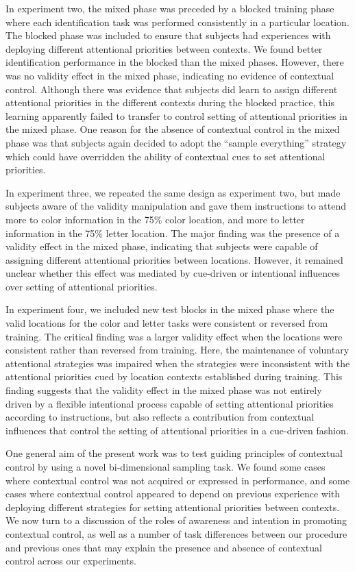 \documentclass[]{DissertateCUNY}
\begin{document}
In experiment two, the mixed phase was preceded by a blocked training
phase where each identification task was performed consistently in a
particular location. The blocked phase was included to ensure that
subjects had experiences with deploying different attentional priorities
between contexts. We found better identification performance in the
blocked than the mixed phases. However, there was no validity effect in
the mixed phase, indicating no evidence of contextual control. Although
there was evidence that subjects did learn to assign different
attentional priorities in the different contexts during the blocked
practice, this learning apparently failed to transfer to control setting
of attentional priorities in the mixed phase. One reason for the absence
of contextual control in the mixed phase was that subjects again decided
to adopt the ``sample everything'' strategy which could have overridden
the ability of contextual cues to set attentional priorities.

In experiment three, we repeated the same design as experiment two, but
made subjects aware of the validity manipulation and gave them
instructions to attend more to color information in the 75\% color
location, and more to letter information in the 75\% letter location.
The major finding was the presence of a validity effect in the mixed
phase, indicating that subjects were capable of assigning different
attentional priorities between locations. However, it remained unclear
whether this effect was mediated by cue-driven or intentional influences
over setting of attentional priorities.

In experiment four, we included new test blocks in the mixed phase where
the valid locations for the color and letter tasks were consistent or
reversed from training. The critical finding was a larger validity
effect when the locations were consistent rather than reversed from
training. Here, the maintenance of voluntary attentional strategies was
impaired when the strategies were inconsistent with the attentional
priorities cued by location contexts established during training. This
finding suggests that the validity effect in the mixed phase was not
entirely driven by a flexible intentional process capable of setting
attentional priorities according to instructions, but also reflects a
contribution from contextual influences that control the setting of
attentional priorities in a cue-driven fashion.

One general aim of the present work was to test guiding principles of
contextual control by using a novel bi-dimensional sampling task. We
found some cases where contextual control was not acquired or expressed
in performance, and some cases where contextual control appeared to
depend on previous experience with deploying different strategies for
setting attentional priorities between contexts. We now turn to a
discussion of the roles of awareness and intention in promoting
contextual control, as well as a number of task differences between our
procedure and previous ones that may explain the presence and absence of
contextual control across our experiments.
\end{document}
